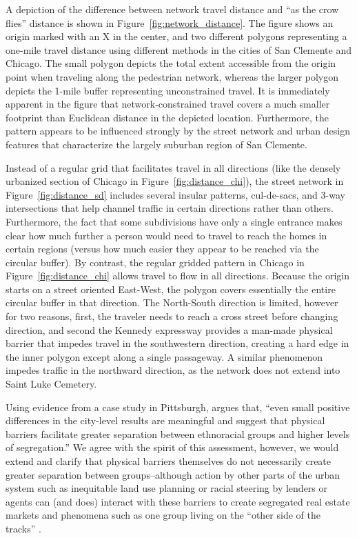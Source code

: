 \documentclass[
  10pt,
]{article}
\begin{document}
A depiction of the difference between network travel distance and ``as
the crow flies'' distance is shown in Figure~\ref{fig:network_distance}.
The figure shows an origin marked with an X in the center, and two
different polygons representing a one-mile travel distance using
different methods in the cities of San Clemente and Chicago. The small
polygon depicts the total extent accessible from the origin point when
traveling along the pedestrian network, whereas the larger polygon
depicts the 1-mile buffer representing unconstrained travel. It is
immediately apparent in the figure that network-constrained travel
covers a much smaller footprint than Euclidean distance in the depicted
location. Furthermore, the pattern appears to be influenced strongly by
the street network and urban design features that characterize the
largely suburban region of San Clemente.

Instead of a regular grid that facilitates travel in all directions
(like the densely urbanized section of Chicago in
Figure~\ref{fig:distance_chi}), the street network in
Figure~\ref{fig:distance_sd} includes several insular patterns,
cul-de-sacs, and 3-way intersections that help channel traffic in
certain directions rather than others. Furthermore, the fact that some
subdivisions have only a single entrance makes clear how much further a
person would need to travel to reach the homes in certain regions
(versus how much easier they appear to be reached via the circular
buffer). By contrast, the regular gridded pattern in Chicago in
Figure~\ref{fig:distance_chi} allows travel to flow in all directions.
Because the origin starts on a street oriented East-West, the polygon
covers essentially the entire circular buffer in that direction. The
North-South direction is limited, however for two reasons, first, the
traveler needs to reach a cross street before changing direction, and
second the Kennedy expressway provides a man-made physical barrier that
impedes travel in the southwestern direction, creating a hard edge in
the inner polygon except along a single passageway. A similar phenomenon
impedes traffic in the northward direction, as the network does not
extend into Saint Luke Cemetery.

Using evidence from a case study in Pittsburgh,
\citet[p.~28]{roberto2018SpatialProximity} argues that, ``even small
positive differences in the city-level results are meaningful and
suggest that physical barriers facilitate greater separation between
ethnoracial groups and higher levels of segregation.'' We agree with the
spirit of this assessment, however, we would extend and clarify that
physical barriers themselves do not necessarily create greater
separation between groups--although action by other parts of the urban
system such as inequitable land use planning or racial steering by
lenders or agents can (and does) interact with these barriers to create
segregated real estate markets and phenomena such as one group living on
the ``other side of the tracks'' \citep{roberto2018SpatialProximity}.
\end{document}
